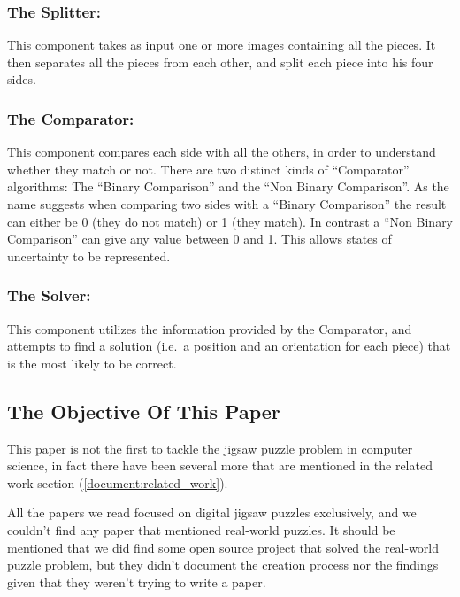 \documentclass[epsfig,a4paper,11pt,titlepage,twoside,openany]{article}
\newenvironment{indented_section}
  {\adjustwidth{3em}{0pt}}
  {\endadjustwidth}
\begin{document}
\begin{indented_section}

    \subsubsection{The Splitter:} This component takes as input one or more images
    containing all the pieces. It then separates all the pieces from each other,
    and split each piece into his four sides.\label{document:splitter}

    \subsubsection{The Comparator:} This component compares each side with all the
    others, in order to understand whether they match or not.\newline
    There are two distinct kinds of “Comparator” algorithms:
    The “Binary Comparison” and the “Non Binary Comparison”.
    As the name suggests when comparing two sides with a “Binary Comparison”
    the result can either be 0 (they do not match) or 1 (they match).
    In contrast a “Non Binary Comparison” can give any value between 0 and 1.
    This allows states of uncertainty to be represented.\label{document:comparator}

    \subsubsection{The Solver:} This component utilizes the information provided by the
    Comparator, and attempts to find a solution
    (i.e.\ a position and an orientation for each piece)
    that is the most likely to be correct.\label{document:solver}

\end{indented_section}


\subsection{The Objective Of This Paper}\label{document:objective}

This paper is not the first to tackle the jigsaw puzzle problem in computer science,
in fact there have been several more that are mentioned in the related work section (\cref{document:related_work}).

All the papers we read focused on digital jigsaw puzzles exclusively,
and we couldn't find any paper that mentioned real-world puzzles.
It should be mentioned that we did find some open source project that solved the
real-world puzzle problem, but they didn’t document the creation process nor the
findings given that they weren't trying to write a paper.
\end{document}
